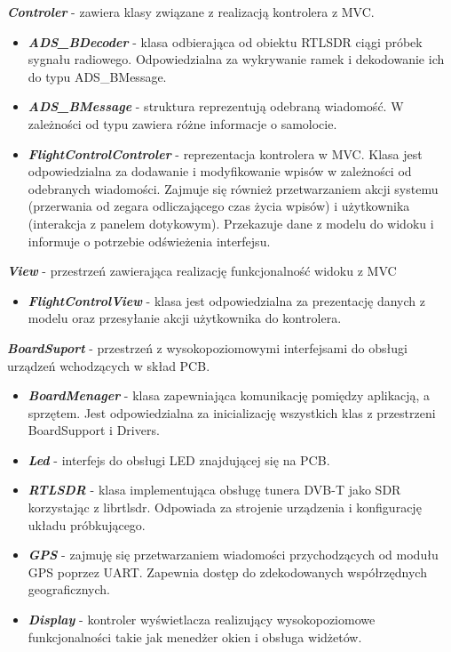 \documentclass[eng,printmode]{mgr}
\begin{document}
\noindent
\textbf{\textit{Controler}} - zawiera klasy związane z realizacją kontrolera z MVC.
\begin{itemize}[label={}]
  \item \textbf{\textit{ADS\_BDecoder}} - klasa odbierająca od obiektu RTLSDR ciągi próbek sygnału radiowego. Odpowiedzialna za wykrywanie ramek i dekodowanie ich do typu ADS\_BMessage.
  \item \textbf{\textit{ADS\_BMessage}} - struktura reprezentują odebraną wiadomość. W zależności od typu zawiera różne informacje o samolocie.
  \item \textbf{\textit{FlightControlControler}} - reprezentacja kontrolera w MVC. Klasa jest odpowiedzialna za dodawanie i modyfikowanie wpisów w zależności od odebranych wiadomości. Zajmuje się również przetwarzaniem akcji systemu (przerwania od zegara odliczającego czas życia wpisów) i użytkownika (interakcja z panelem dotykowym). Przekazuje dane z modelu do widoku i informuje o potrzebie odświeżenia interfejsu.
\end{itemize}
\vskip 0.55cm

\noindent
\textbf{\textit{View}} - przestrzeń zawierająca realizację funkcjonalność widoku z MVC
\begin{itemize}[label={}]
  \item \textbf{\textit{FlightControlView}} - klasa jest odpowiedzialna za prezentację danych z modelu oraz przesyłanie akcji użytkownika do kontrolera.
\end{itemize}
\vskip 0.55cm

\noindent
\textbf{\textit{BoardSuport}} - przestrzeń z wysokopoziomowymi interfejsami do obsługi urządzeń wchodzących w skład PCB. 
\begin{itemize}[label={}]
  \item \textbf{\textit{BoardMenager}} - klasa zapewniająca komunikację pomiędzy aplikacją, a sprzętem. Jest odpowiedzialna za inicializację wszystkich klas z przestrzeni BoardSupport i Drivers.
  \item \textbf{\textit{Led}} - interfejs do obsługi LED znajdującej się na PCB.
  \item \textbf{\textit{RTLSDR}} - klasa implementująca obsługę tunera DVB-T jako SDR korzystając z librtlsdr. Odpowiada za strojenie urządzenia i konfigurację układu próbkującego. 
  \item \textbf{\textit{GPS}} - zajmuję się przetwarzaniem wiadomości przychodzących od modułu GPS poprzez UART. Zapewnia dostęp do zdekodowanych współrzędnych geograficznych.
  \item \textbf{\textit{Display}} - kontroler wyświetlacza realizujący wysokopoziomowe funkcjonalności takie jak menedżer okien i obsługa widżetów.
\end{itemize}
\vskip 0.55cm
\end{document}
